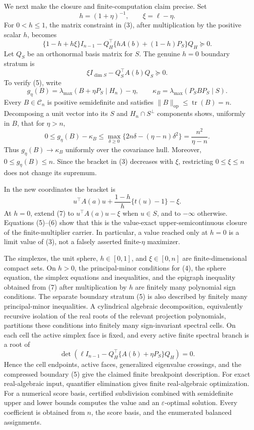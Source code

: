 We next make the closure and finite-computation claim precise.  Set
\[
h=(1+\eta)^{-1},
\qquad
\xi=\ell-\eta.
\]
For \(0<h\leq1\), the matrix constraint in (3), after multiplication by the positive scalar \(h\), becomes
\[
\{1-h+h\xi\}I_{n-1}
-Q_H^\top\{hA(b)+(1-h)P_S\}Q_H\succeq0.
\tag{4}
\]
Let \(Q_S\) be an orthonormal basis matrix for \(S\).  The genuine \(h=0\) boundary stratum is
\[
\xi I_{\dim S}-Q_S^\top A(b)Q_S\succeq0.
\tag{5}
\]
To verify (5), write
\[
g_\eta(B)=\lambda_{\max}(B+\eta P_S\mid H_n)-\eta,
\qquad
\kappa_B=\lambda_{\max}(P_SBP_S\mid S).
\]
Every \(B\in\mathcal C_n\) is positive semidefinite and satisfies \(\|B\|_{\mathrm{op}}\leq\operatorname{tr}(B)=n\).  Decomposing a unit vector into its \(S\) and \(H_n\cap S^\perp\) components shows, uniformly in \(B\), that for \(\eta>n\),
\[
0\leq g_\eta(B)-\kappa_B
\leq\max_{\delta\geq0}
\{2n\delta-(\eta-n)\delta^2\}
=\frac{n^2}{\eta-n}.
\tag{6}
\]
Thus \(g_\eta(B)\to\kappa_B\) uniformly over the covariance hull.  Moreover, \(0\leq g_\eta(B)\leq n\).  Since the bracket in (3) decreases with \(\xi\), restricting \(0\leq\xi\leq n\) does not change its supremum.

In the new coordinates the bracket is
\[
u^\top A(a)u+\frac{1-h}{h}\{t(u)-1\}-\xi.
\tag{7}
\]
At \(h=0\), extend (7) to \(u^\top A(a)u-\xi\) when \(u\in S\), and to \(-\infty\) otherwise.  Equations (5)--(6) show that this is the value-exact upper-semicontinuous closure of the finite-multiplier carrier.  In particular, a value reached only at \(h=0\) is a limit value of (3), not a falsely asserted finite-\(\eta\) maximizer.

The simplexes, the unit sphere, \(h\in[0,1]\), and \(\xi\in[0,n]\) are finite-dimensional compact sets.  On \(h>0\), the principal-minor conditions for (4), the sphere equation, the simplex equations and inequalities, and the epigraph inequality obtained from (7) after multiplication by \(h\) are finitely many polynomial sign conditions.  The separate boundary stratum (5) is also described by finitely many principal-minor inequalities.  A cylindrical algebraic decomposition, equivalently recursive isolation of the real roots of the relevant projection polynomials, partitions these conditions into finitely many sign-invariant spectral cells.  On each cell the active simplex face is fixed, and every active finite spectral branch is a root of
\[
\det\!\left(\ell I_{n-1}
-Q_H^\top\{A(b)+\eta P_S\}Q_H\right)=0.
\]
Hence the cell endpoints, active faces, generalized eigenvalue crossings, and the compressed boundary (5) give the claimed finite breakpoint description.  For exact real-algebraic input, quantifier elimination gives finite real-algebraic optimization.  For a numerical score basis, certified subdivision combined with semidefinite upper and lower bounds computes the value and an \(\varepsilon\)-optimal solution.  Every coefficient is obtained from \(n\), the score basis, and the enumerated balanced assignments.

